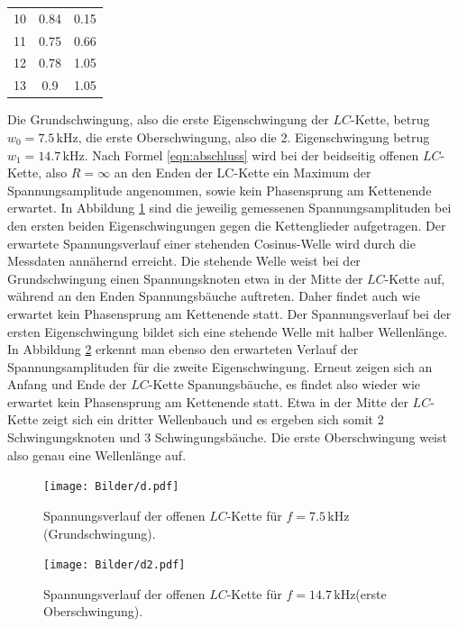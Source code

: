 \begin{table}
\begin{tabular}{ccc}
		10                      & 0.84                                   & 0.15                                   \\
		11                      & 0.75                                   & 0.66                                   \\
		12                      & 0.78                                   & 1.05                                   \\
		13                      & 0.9                                    & 1.05                                   \\
		\bottomrule
	\end{tabular}
\end{table}

Die Grundschwingung, also die erste Eigenschwingung der $LC$-Kette, betrug $w_{\mathrm{0}}=7.5 \,\si{\kilo\Hz}$, die erste Oberschwingung, also die 2. Eigenschwingung betrug $w_{\mathrm{1}}=14.7 \,\si{\kilo\Hz}$.
Nach Formel  \eqref{eqn:abschluss} wird bei der beidseitig offenen $LC$-Kette, also $R=\infty$ an den Enden der LC-Kette ein Maximum der Spannungsamplitude angenommen, sowie kein Phasensprung am Kettenende erwartet.
In Abbildung \ref{fig:plotdeins} sind die jeweilig gemessenen Spannungsamplituden bei den ersten beiden Eigenschwingungen gegen die Kettenglieder aufgetragen.
Der erwartete Spannungsverlauf einer stehenden Cosinus-Welle wird durch die Messdaten annähernd erreicht. Die stehende Welle weist bei der Grundschwingung einen Spannungsknoten etwa in der Mitte der $LC$-Kette auf, während an den Enden Spannungsbäuche auftreten.
Daher findet auch wie erwartet kein Phasensprung am Kettenende statt.
Der Spannungsverlauf bei der ersten Eigenschwingung bildet sich eine stehende Welle mit halber Wellenlänge.
In Abbildung \ref{fig:plotd} erkennt man ebenso den erwarteten Verlauf der Spannungsamplituden für die zweite Eigenschwingung.
Erneut zeigen sich an Anfang und Ende der $LC$-Kette Spanungsbäuche, es findet also wieder wie erwartet kein Phasensprung am Kettenende statt.
Etwa in der Mitte der $LC$-Kette zeigt sich ein dritter Wellenbauch und es ergeben sich somit 2 Schwingungsknoten und 3 Schwingungsbäuche.
Die erste Oberschwingung weist also genau eine Wellenlänge auf.
\begin{figure}
	\centering
	\texttt{[image: Bilder/d.pdf]}
	\caption{Spannungsverlauf der offenen $LC$-Kette für $f=7.5 \,\si{\kilo\Hz}$(Grundschwingung).}
	\label{fig:plotdeins}
\end{figure}

\begin{figure}
	\centering
	\texttt{[image: Bilder/d2.pdf]}
	\caption{Spannungsverlauf der offenen $LC$-Kette für $f=14.7 \,\si{\kilo\Hz}$(erste Oberschwingung).}
	\label{fig:plotd}
\end{figure}
\FloatBarrier
